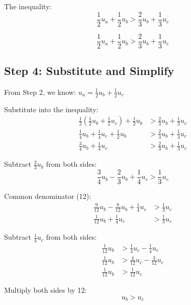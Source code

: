\documentclass[11pt]{article}
\begin{document}
The inequality:
\begin{equation}
\frac{1}{2}u_a + \frac{1}{2}u_b > \frac{2}{3}u_b + \frac{1}{3}u_c
\end{equation}

\begin{tcolorbox}[colback=green!5!white,colframe=green!75!black,title=Key Inequality]
$$\frac{1}{2}u_a + \frac{1}{2}u_b > \frac{2}{3}u_b + \frac{1}{3}u_c$$
\end{tcolorbox}

\subsection{Step 4: Substitute and Simplify}

From Step 2, we know: $u_a = \frac{1}{2}u_b + \frac{1}{2}u_c$

Substitute into the inequality:
\begin{align}
\frac{1}{2}\left(\frac{1}{2}u_b + \frac{1}{2}u_c\right) + \frac{1}{2}u_b &> \frac{2}{3}u_b + \frac{1}{3}u_c \\
\frac{1}{4}u_b + \frac{1}{4}u_c + \frac{1}{2}u_b &> \frac{2}{3}u_b + \frac{1}{3}u_c \\
\frac{3}{4}u_b + \frac{1}{4}u_c &> \frac{2}{3}u_b + \frac{1}{3}u_c
\end{align}

Subtract $\frac{2}{3}u_b$ from both sides:
\begin{equation}
\frac{3}{4}u_b - \frac{2}{3}u_b + \frac{1}{4}u_c > \frac{1}{3}u_c
\end{equation}

Common denominator (12):
\begin{align}
\frac{9}{12}u_b - \frac{8}{12}u_b + \frac{1}{4}u_c &> \frac{1}{3}u_c \\
\frac{1}{12}u_b + \frac{1}{4}u_c &> \frac{1}{3}u_c
\end{align}

Subtract $\frac{1}{4}u_c$ from both sides:
\begin{align}
\frac{1}{12}u_b &> \frac{1}{3}u_c - \frac{1}{4}u_c \\
\frac{1}{12}u_b &> \frac{4}{12}u_c - \frac{3}{12}u_c \\
\frac{1}{12}u_b &> \frac{1}{12}u_c
\end{align}

Multiply both sides by 12:
\begin{equation}
u_b > u_c
\end{equation}
\end{document}
